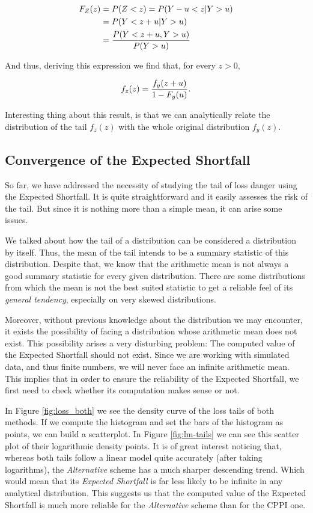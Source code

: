 \begin{align}
    F_Z(z)  &=  P(Z < z) = P\qty(Y-u < z | Y>u)  \\
            &=  P\qty(Y<z+u | Y>u) \\
            &= \frac{P\qty(Y<z+u, Y>u)}{P\qty(Y>u)}
\end{align}

And thus, deriving this expression we find that, for every $z>0$,

\begin{align}
    f_z(z) = \frac{f_y\qty(z+u)}{1-F_y(u)}\textit{.}
\end{align}

Interesting thing about this result, is that we can analytically relate the distribution of the tail $f_z(z)$ with the whole original distribution $f_y(z)$.

\subsection{Convergence of the Expected Shortfall}

So far, we have addressed the necessity of studying the tail of loss danger using the Expected Shortfall. It is quite straightforward and it easily assesses the risk of the tail. But since it is nothing more than a simple mean, it can arise some issues. 

We talked about how the tail of a distribution can be considered a distribution by itself. Thus, the mean of the tail intends to be a summary statistic of this distribution. Despite that, we know that the arithmetic mean is not always a good summary statistic for every given distribution. There are some distributions from which the mean is not the best suited statistic to get a reliable feel of its \emph{general tendency}, especially on very skewed distributions.

Moreover, without previous knowledge about the distribution we may encounter, it exists the possibility of facing a distribution whose arithmetic mean does not exist. This possibility arises a very disturbing problem: The computed value of the Expected Shortfall should not exist. Since we are working with simulated data, and thus finite numbers, we will never face an infinite arithmetic mean. This implies that in order to ensure the reliability of the Expected Shortfall, we first need to check whether its computation makes sense or not.

In Figure \ref{fig:loss_both} we see the density curve of the loss tails of both methods. If we compute the histogram and set the bars of the histogram as points, we can build a scatterplot. 
In Figure \ref{fig:lm-tails} we can see this scatter plot of their logarithmic density points. It is of great interest noticing that, whereas both tails follow a linear model quite accurately (after taking logarithms), the \textit{Alternative} scheme has a much sharper descending trend. Which would mean that its \textit{Expected Shortfall} is far less likely to be infinite in any analytical distribution. This suggests us that the computed value of the Expected Shortfall is much more reliable for the \textit{Alternative} scheme than for the CPPI one.

